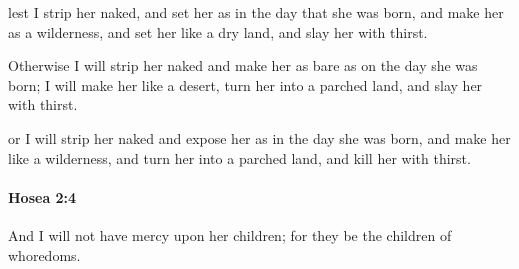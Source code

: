 			\begin{versebox}
					\item[BHS] 
					\item[LXX] 
					\item[ASV] lest I strip her naked, and set her as in the day that she was born, and make her as a wilderness, and set her like a dry land, and slay her with thirst.
					\item[NIV] Otherwise I will strip her naked and make her as bare as on the day she was born; I will make her like a desert, turn her into a parched land, and slay her with thirst.
					\item[NRSV] or I will strip her naked and expose her as in the day she was born, and make her like a wilderness, and turn her into a parched land, and kill her with thirst.
			\end{versebox}

		\paragraph{Hosea 2:4} %
			\label{HOSEA-2-4}

			And I will not have mercy upon her children; for they be the children of whoredoms.

